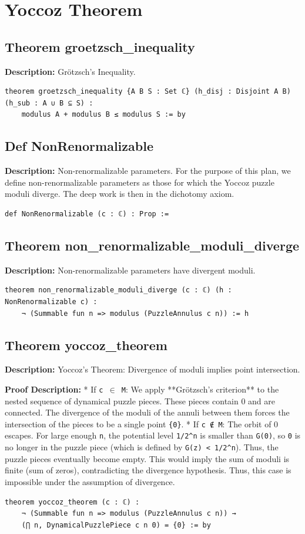 \section{Yoccoz Theorem}

\subsection*{Theorem groetzsch\_inequality}
\textbf{Description:} Grötzsch's Inequality.

\begin{lstlisting}[language=Lean]
theorem groetzsch_inequality {A B S : Set ℂ} (h_disj : Disjoint A B) (h_sub : A ∪ B ⊆ S) :
    modulus A + modulus B ≤ modulus S := by
\end{lstlisting}

\subsection*{Def NonRenormalizable}
\textbf{Description:} Non-renormalizable parameters.
    For the purpose of this plan, we define non-renormalizable parameters
    as those for which the Yoccoz puzzle moduli diverge.
    The deep work is then in the dichotomy axiom.

\begin{lstlisting}[language=Lean]
def NonRenormalizable (c : ℂ) : Prop :=
\end{lstlisting}

\subsection*{Theorem non\_renormalizable\_moduli\_diverge}
\textbf{Description:} Non-renormalizable parameters have divergent moduli.

\begin{lstlisting}[language=Lean]
theorem non_renormalizable_moduli_diverge (c : ℂ) (h : NonRenormalizable c) :
    ¬ (Summable fun n => modulus (PuzzleAnnulus c n)) := h
\end{lstlisting}

\subsection*{Theorem yoccoz\_theorem}
\textbf{Description:} Yoccoz's Theorem: Divergence of moduli implies point intersection.

\textbf{Proof Description:} *   If \texttt{c $\in$ M}: We apply **Grötzsch's criterion** to the nested sequence of dynamical puzzle pieces.
        These pieces contain 0 and are connected. The divergence of the moduli of the annuli between
        them forces the intersection of the pieces to be a single point \texttt{\{0\}}.
    *   If \texttt{c ∉ M}: The orbit of 0 escapes. For large enough \texttt{n}, the potential level \texttt{1/2\^{}n}
        is smaller than \texttt{G(0)}, so \texttt{0} is no longer in the puzzle piece (which is defined by \texttt{G(z) < 1/2\^{}n}).
        Thus, the puzzle pieces eventually become empty. This would imply the sum of moduli is finite
        (sum of zeros), contradicting the divergence hypothesis. Thus, this case is impossible under
        the assumption of divergence.

\begin{lstlisting}[language=Lean]
theorem yoccoz_theorem (c : ℂ) :
    ¬ (Summable fun n => modulus (PuzzleAnnulus c n)) →
    (⋂ n, DynamicalPuzzlePiece c n 0) = {0} := by
\end{lstlisting}

